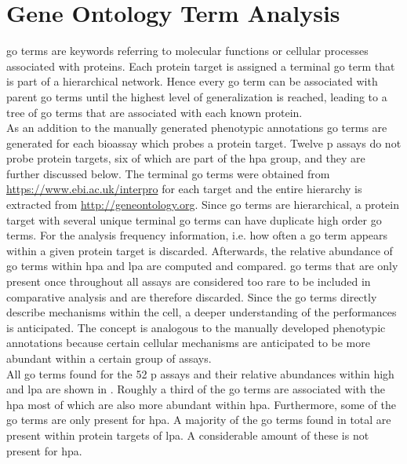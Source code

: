 \section{Gene Ontology Term Analysis}\label{sec:goterms}
\ac{go} terms are keywords referring to molecular functions or cellular processes associated with proteins. Each protein target is assigned a terminal \ac{go} term that is part of a hierarchical network. Hence every \ac{go} term can be associated with parent \ac{go} terms until the highest level of generalization is reached, leading to a tree of \ac{go} terms that are associated with each known protein.\\
As an addition to the manually generated phenotypic annotations \ac{go} terms are generated for each bioassay which probes a protein target. Twelve \ac{p} assays do not probe protein targets, six of which are part of the \acl{hpa} group, and they are further discussed below. The terminal \ac{go} terms were obtained from \url{https://www.ebi.ac.uk/interpro} for each target and the entire hierarchy is extracted from \url{http://geneontology.org}. Since \ac{go} terms are hierarchical, a protein target with several unique terminal \ac{go} terms can have duplicate high order \ac{go} terms. For the analysis frequency information, i.e. how often a \ac{go} term appears within a given protein target is discarded. Afterwards, the relative abundance of \ac{go} terms within \acl{hpa} and \acl{lpa} are computed and compared. \ac{go} terms that are only present once throughout all assays are considered too rare to be included in comparative analysis and are therefore discarded. Since the \ac{go} terms directly describe mechanisms within the cell, a deeper understanding of the performances is anticipated. The concept is analogous to the manually developed phenotypic annotations because certain cellular mechanisms are anticipated to be more abundant within a certain group of assays.\\
All \ac{go} terms found for the \num{52} \ac{p} assays and their relative abundances within high and \acl{lpa} are shown in . Roughly a third of the \ac{go} terms are associated with the \acl{hpa} most of which are also more abundant within \acl{hpa}. Furthermore, some of the \ac{go} terms are only present for \acl{hpa}. A majority of the \ac{go} terms found in total are present within protein targets of \acl{lpa}. A considerable amount of these is not present for \acl{hpa}.\\
